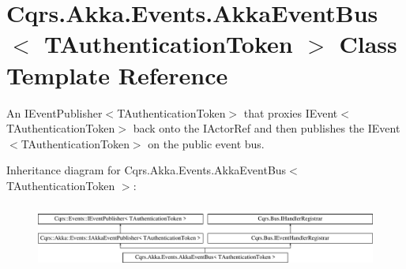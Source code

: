 \hypertarget{classCqrs_1_1Akka_1_1Events_1_1AkkaEventBus}{}\section{Cqrs.\+Akka.\+Events.\+Akka\+Event\+Bus$<$ T\+Authentication\+Token $>$ Class Template Reference}
\label{classCqrs_1_1Akka_1_1Events_1_1AkkaEventBus}


An I\+Event\+Publisher$<$\+T\+Authentication\+Token$>$ that proxies I\+Event$<$\+T\+Authentication\+Token$>$ back onto the I\+Actor\+Ref and then publishes the I\+Event$<$\+T\+Authentication\+Token$>$ on the public event bus.  


Inheritance diagram for Cqrs.\+Akka.\+Events.\+Akka\+Event\+Bus$<$ T\+Authentication\+Token $>$\+:\begin{figure}[H]
\begin{center}
\leavevmode
\includegraphics[height=2.148338cm]{classCqrs_1_1Akka_1_1Events_1_1AkkaEventBus}
\end{center}
\end{figure}
